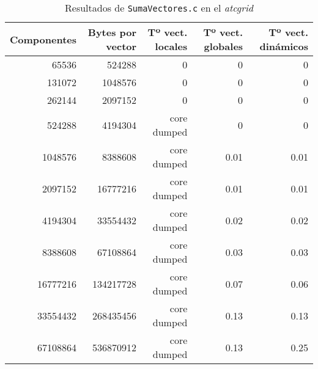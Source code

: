 \begin{center}
\begin{table}[!h]
\begin{tabular}{r r r r r}
\textbf{Componentes} & \textbf{Bytes por vector} & \textbf{Tº vect. locales} & \textbf{Tº vect. globales} & \textbf{Tº vect. dinámicos} \\
\toprule
65536                & 524288                    & 0                         & 0                          & 0                           \\
131072               & 1048576                   & 0                         & 0                          & 0                           \\
262144               & 2097152                   & 0                         & 0                          & 0                           \\
524288               & 4194304                   & core dumped               & 0                          & 0                           \\
1048576              & 8388608                   & core dumped               & 0.01                       & 0.01                        \\
2097152              & 16777216                  & core dumped               & 0.01                       & 0.01                        \\
4194304              & 33554432                  & core dumped               & 0.02                       & 0.02                        \\
8388608              & 67108864                  & core dumped               & 0.03                       & 0.03                        \\
16777216             & 134217728                 & core dumped               & 0.07                       & 0.06                        \\
33554432             & 268435456                 & core dumped               & 0.13                       & 0.13                        \\
67108864             & 536870912                 & core dumped               & 0.13                       & 0.25                        \\
\end{tabular}
\caption{Resultados de \texttt{SumaVectores.c} en el \textit{atcgrid}}
\end{table}
\end{center}

\section{}\label{ej1-8}

